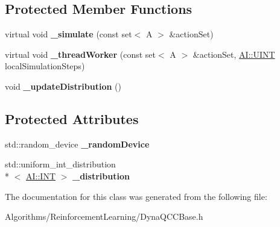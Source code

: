 \subsection*{Protected Member Functions}
\begin{DoxyCompactItemize}
\item 
\hypertarget{classAI_1_1Algorithm_1_1DynaQCCBase_adc1bb07bb9025dc0c2963ded741b43a2}{virtual void {\bfseries \-\_\-simulate} (const set$<$ A $>$ \&action\-Set)}\label{classAI_1_1Algorithm_1_1DynaQCCBase_adc1bb07bb9025dc0c2963ded741b43a2}

\item 
\hypertarget{classAI_1_1Algorithm_1_1DynaQCCBase_a56e5d7ee46d67400f9e2411e801f93d2}{virtual void {\bfseries \-\_\-thread\-Worker} (const set$<$ A $>$ \&action\-Set, \hyperlink{namespaceAI_ab6e14dc1e659854858a87e511f1439ec}{A\-I\-::\-U\-I\-N\-T} local\-Simulation\-Steps)}\label{classAI_1_1Algorithm_1_1DynaQCCBase_a56e5d7ee46d67400f9e2411e801f93d2}

\item 
\hypertarget{classAI_1_1Algorithm_1_1DynaQCCBase_aeff65821d73179f84390892d8a2b0d3c}{void {\bfseries \-\_\-update\-Distribution} ()}\label{classAI_1_1Algorithm_1_1DynaQCCBase_aeff65821d73179f84390892d8a2b0d3c}

\end{DoxyCompactItemize}
\subsection*{Protected Attributes}
\begin{DoxyCompactItemize}
\item 
\hypertarget{classAI_1_1Algorithm_1_1DynaQCCBase_a0826c4c68c5d7b11bcb560d1b23b3252}{std\-::random\-\_\-device {\bfseries \-\_\-random\-Device}}\label{classAI_1_1Algorithm_1_1DynaQCCBase_a0826c4c68c5d7b11bcb560d1b23b3252}

\item 
\hypertarget{classAI_1_1Algorithm_1_1DynaQCCBase_ab2859ca39decdd0a8921e0ac500ed6f3}{std\-::uniform\-\_\-int\-\_\-distribution\\*
$<$ \hyperlink{namespaceAI_ac74584e573f07aa4194b461b1ba7be64}{A\-I\-::\-I\-N\-T} $>$ {\bfseries \-\_\-distribution}}\label{classAI_1_1Algorithm_1_1DynaQCCBase_ab2859ca39decdd0a8921e0ac500ed6f3}

\end{DoxyCompactItemize}


The documentation for this class was generated from the following file\-:\begin{DoxyCompactItemize}
\item 
Algorithms/\-Reinforcement\-Learning/Dyna\-Q\-C\-C\-Base.\-h\end{DoxyCompactItemize}
